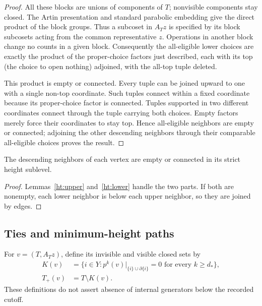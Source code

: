 \begin{proof}
All these blocks are unions of components of \(T\); nonvisible
components stay closed.  The Artin presentation and standard
parabolic embedding give the direct product of the block groups.
Thus a subcoset in \(A_Tz\) is specified by its block subcosets acting
from the common representative \(z\).
Operations in another block change no counts in a given block.
Consequently the all-eligible lower choices are exactly the product
of the proper-choice factors just described, each with its top
(the choice to open nothing) adjoined, with the all-top tuple deleted.

This product is empty or connected.
Every tuple can be joined upward to one with a single non-top
coordinate.  Such tuples connect within a fixed coordinate because
its proper-choice factor is connected.  Tuples supported in two
different coordinates connect through the tuple carrying both
choices.  Empty factors merely force their coordinates to stay top.
Hence all-eligible neighbors are empty or connected; adjoining the
other descending neighbors through their comparable all-eligible
choices proves the result.
\end{proof}

\begin{corollary}
\label{ht:descending}
The descending neighbors of each vertex are empty or connected in its
strict height sublevel.
\end{corollary}

\begin{proof}
Lemmas~\ref{ht:upper} and~\ref{ht:lower} handle the two parts.
If both are nonempty, each lower neighbor is below each upper neighbor,
so they are joined by edges.
\end{proof}

\subsection{Ties and minimum-height paths}

For \(v=(T,A_Tz)\), define its invisible and visible closed sets by
\begin{equation}
 \begin{split}
 K(v)&=\{i\in Y:
  p^k(v)|_{\{i\}\cup\partial\{i\}}=0
       \text{ for every }k\ge d_*\},\\
 T_+(v)&=T\setminus K(v).
 \end{split}
 \label{ht:invisible}
\end{equation}
These definitions do not assert absence of internal generators below
the recorded cutoff.

